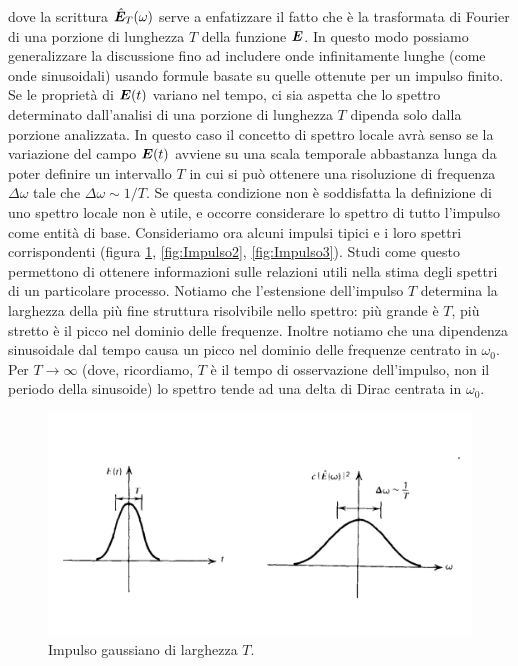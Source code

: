 dove la scrittura $\hat{\V{E}}_T(\omega)$ serve a enfatizzare il fatto che è la trasformata di Fourier di una porzione di lunghezza $T$ della funzione $\V{E}$. In questo modo possiamo generalizzare la discussione fino ad includere onde infinitamente lunghe (come onde sinusoidali) usando formule basate su quelle ottenute per un impulso finito. Se le proprietà di $\V{E}(t)$ variano nel tempo, ci sia aspetta che lo spettro determinato dall'analisi di una porzione di lunghezza $T$ dipenda solo dalla porzione analizzata. In questo caso il concetto di spettro locale avrà senso se la variazione del campo $\V{E}(t)$ avviene su una scala temporale abbastanza lunga da poter definire un intervallo $T$ in cui si può ottenere una risoluzione di frequenza $\Delta \omega$ tale che $\Delta\omega \sim 1/T$. Se questa condizione non è soddisfatta la definizione di uno spettro locale non è utile, e occorre considerare lo spettro di tutto l'impulso come entità di base. Consideriamo ora alcuni impulsi tipici e i loro spettri corrispondenti (figura \ref{fig:Impulso1}, \ref{fig:Impulso2}, \ref{fig:Impulso3}). Studi come questo permettono di ottenere informazioni sulle relazioni utili nella stima degli spettri di un particolare processo. Notiamo che l'estensione dell'impulso $T$ determina la larghezza della più fine struttura risolvibile nello spettro: più grande è $T$, più stretto è il picco nel dominio delle frequenze. Inoltre notiamo che una dipendenza sinusoidale dal tempo causa un picco nel dominio delle frequenze centrato in $\omega_0$. Per $T\to\infty$ (dove, ricordiamo, $T$ è il tempo di osservazione dell'impulso, non il periodo della sinusoide) lo spettro tende ad una delta di Dirac centrata in $\omega_0$.
\begin{figure}
\includegraphics[width=\textwidth]{img/Impulso1}
\caption{Impulso gaussiano di larghezza $T$.}\label{fig:Impulso1}
\end{figure}

